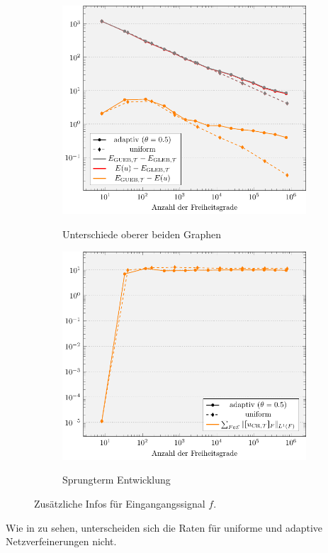 \begin{figure}[p]
  \centering
  \begin{subfigure}[b]{.48\linewidth}
    \centering
    \caption{Unterschiede oberer beiden Graphen}
    \includegraphics[width=\linewidth]
      {pictures/chapExperiments/secExactSol/f01/energyDiffs.pdf}
    \label{fig:f01DiffGuebExactE}
  \end{subfigure}
  \quad
  \begin{subfigure}[b]{.48\linewidth}
    \centering
    \caption{Sprungterm Entwicklung}
    \includegraphics[width=\linewidth]
      {pictures/chapExperiments/secExactSol/f01/jumpTerms.pdf}
    \label{fig:f01JumpTerms}
  \end{subfigure}
  \caption{Zusätzliche Infos für Eingangangssignal $f$.}
  \label{fig:f01SupplementaryInfo}
\end{figure}
Wie in  zu sehen, unterscheiden sich die Raten für
uniforme und adaptive Netzverfeinerungen nicht.

